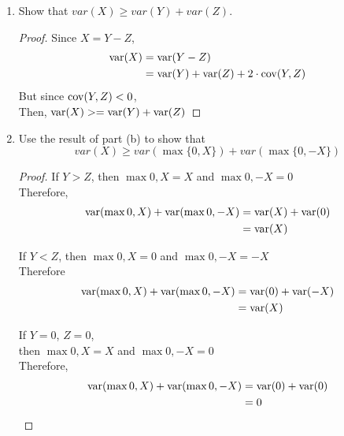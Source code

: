 \documentclass[paper=usletter, fontsize=12pt]{article}
\begin{document}
\begin{enumerate}
\begin{enumerate}
\begin{proof}
            \end{proof}

            \item Show that $var(X) \ge var(Y)+var(Z)$.
            \begin{proof}

                Since $X=Y-Z$,
                \begin{align*}
                    \operatorname{var}(X) &=\operatorname{var}(Y-Z) \\
                    &= \operatorname{var}(Y)+\operatorname{var}(Z)+2 \cdot\operatorname{cov}(Y,Z)
                \end{align*}
                But since $\operatorname{cov}(Y,Z)< 0$, \\
                Then, $\operatorname{var}(X) >=\operatorname{var}(Y)+\operatorname{var}(Z)$ \qedhere

            \end{proof}

            \item Use the result of part (b) to show that
            \begin{equation*}
                var(X) \ge var(\max\{0,X\})+var(\max\{0,-X\})
            \end{equation*}
            \begin{proof}

                If $Y>Z$, then $\max{0,X}=X$ and $\max{0,-X}=0$\\
                Therefore,
                \begin{align*}
                    \operatorname{var}(\max{0,X})+\operatorname{var}(\max{0,-X}) &=\operatorname{var}(X)+\operatorname{var}(0)\\
                    & =\operatorname{var}(X)
                \end{align*}

                If $Y<Z$, then $\max{0,X}=0$ and $\max{0,-X}=-X$\\
                Therefore
                \begin{align*}
                    \operatorname{var}(\max{0,X})+\operatorname{var}(\max{0,-X}) &=\operatorname{var}(0)+\operatorname{var}(-X)\\
                    & =\operatorname{var}(X)
                \end{align*}

                If $Y=0$, $Z=0$,\\
                then $\max{0,X}=X$ and $\max{0,-X}=0$\\
                Therefore,
                \begin{align*}
                    \operatorname{var}(\max{0,X})+\operatorname{var}(\max{0,-X}) &=\operatorname{var}(0)+\operatorname{var}(0) \\
                    & =0
                \end{align*}


\end{proof}
\end{enumerate}
\end{enumerate}
\end{document}
